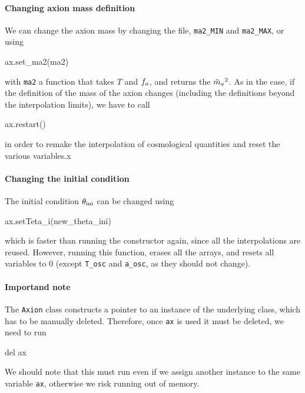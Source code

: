 \documentclass[11pt,a4paper]{article}
\begin{document}
\paragraph{Changing axion mass definition}
%
We can change the axion mass by changing the file, {\tt ma2\_MIN} and {\tt ma2\_MAX}, or using 
%
\begin{cpp}
	ax.set_ma2(ma2)
\end{cpp}
%
with {\tt ma2} a function that takes $T$ and $f_{a}{}$, and returns the $\tilde m_{a}{}^2$. As in the \CPP case, if the definition of the mass of the axion changes (including the definitions beyond the interpolation limits), we have to call
%
\begin{cpp}
	ax.restart()
\end{cpp}
%
in order to remake the interpolation of cosmological quantities and reset the various variables.x

\paragraph{Changing the initial condition}
%
The initial condition $\theta_{\rm ini}{}$ can be changed using 
%
\begin{py}
	ax.setTeta_i(new_theta_ini)
\end{py}
%
which is faster than running the constructor again, since all the interpolations are reused. However, running this function, erases all the arrays, and resets all variables to $0$ (except {\tt T\_osc} and {\tt a\_osc}, as they should not change). 

\paragraph{Importand note} The {\tt Axion} class constructs a pointer to an instance of the underlying  class, which has to be manually deleted. Therefore, once {\tt ax} is used it must be deleted, \ie we need to run 
%
\begin{py}
	del ax
\end{py}
%
We should note that this must run even if we assign another instance to the same variable {\tt ax}, otherwise we risk running out of memory.
\end{document}
